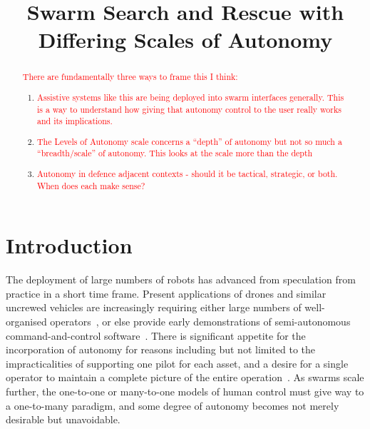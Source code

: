 \documentclass[10pt]{article}
\title{Swarm Search and Rescue with Differing Scales of Autonomy}
\author{}
\date{}
\theoremstyle{definition}
\begin{document}
\maketitle

\begin{abstract}
\textcolor{red}{There are fundamentally three ways to frame this I think:}
\begin{enumerate}
    \item \textcolor{red}{Assistive systems like this are being deployed into swarm interfaces generally. This is a way to understand how giving that autonomy control to the user really works and its implications.}
    \item \textcolor{red}{The Levels of Autonomy scale concerns a ``depth'' of autonomy but not so much a ``breadth/scale'' of autonomy. This looks at the scale more than the depth}
    \item \textcolor{red}{Autonomy in defence adjacent contexts - should it be tactical, strategic, or both. When does each make sense?}
\end{enumerate}
\end{abstract}

\section{Introduction}\label{sec:intro}

The deployment of large numbers of robots has advanced from speculation from practice in a short time frame. Present applications of drones and similar uncrewed vehicles are increasingly requiring either large numbers of well-organised operators~\cite{ramchurn2016disaster}, or else provide early demonstrations of semi-autonomous command-and-control software~\cite{anduril2023lattice}. There is significant appetite for the incorporation of autonomy for reasons including but not limited to the impracticalities of supporting one pilot for each asset, and a desire for a single operator to maintain a complete picture of the entire operation~\cite{mod2022ukairpower}. As swarms scale further, the one-to-one or many-to-one models of human control must give way to a one-to-many paradigm, and some degree of autonomy becomes not merely desirable but unavoidable.
\end{document}
